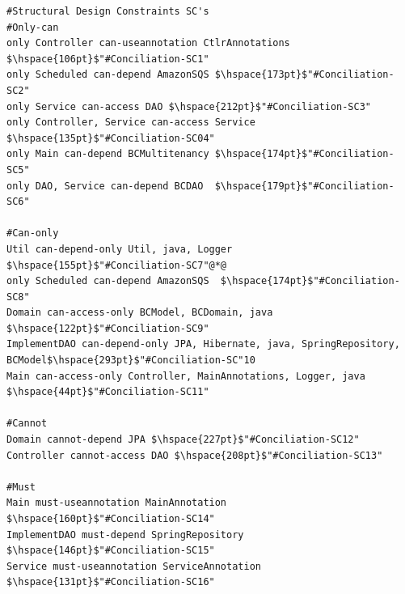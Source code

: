 \documentclass[12pt]{article}
\begin{document}
\begin{lstlisting}[style=colorido, caption={\textcolor{blue}{Conciliation microservice's architectural design specification.}},label={list:especArquiteturalConciliation}
]
#Structural Design Constraints SC's
#Only-can
only Controller can-useannotation CtlrAnnotations $\hspace{106pt}$"#Conciliation-SC1"
only Scheduled can-depend AmazonSQS	$\hspace{173pt}$"#Conciliation-SC2"
only Service can-access DAO	$\hspace{212pt}$"#Conciliation-SC3"
only Controller, Service can-access Service $\hspace{135pt}$"#Conciliation-SC04"
only Main can-depend BCMultitenancy	$\hspace{174pt}$"#Conciliation-SC5"
only DAO, Service can-depend BCDAO	$\hspace{179pt}$"#Conciliation-SC6"
	
#Can-only
Util can-depend-only Util, java, Logger $\hspace{155pt}$"#Conciliation-SC7"@*@
only Scheduled can-depend AmazonSQS	 $\hspace{174pt}$"#Conciliation-SC8"
Domain can-access-only BCModel, BCDomain, java $\hspace{122pt}$"#Conciliation-SC9"
ImplementDAO can-depend-only JPA, Hibernate, java, SpringRepository, BCModel$\hspace{293pt}$"#Conciliation-SC"10
Main can-access-only Controller, MainAnnotations, Logger, java $\hspace{44pt}$"#Conciliation-SC11"

#Cannot
Domain cannot-depend JPA $\hspace{227pt}$"#Conciliation-SC12"
Controller cannot-access DAO $\hspace{208pt}$"#Conciliation-SC13"

#Must
Main must-useannotation MainAnnotation	$\hspace{160pt}$"#Conciliation-SC14"
ImplementDAO must-depend SpringRepository $\hspace{146pt}$"#Conciliation-SC15"
Service must-useannotation ServiceAnnotation $\hspace{131pt}$"#Conciliation-SC16"
\end{lstlisting}
\end{document}
